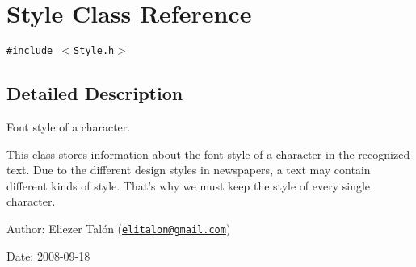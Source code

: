 \hypertarget{class_style}{
\section{Style Class Reference}
\label{class_style}
}
{\tt \#include $<$Style.h$>$}



\subsection{Detailed Description}
Font style of a character. 

This class stores information about the font style of a character in the recognized text. Due to the different design styles in newspapers, a text may contain different kinds of style. That's why we must keep the style of every single character.

\begin{Desc}
\item[Author:]Eliezer Talón (\href{mailto:elitalon@gmail.com}{\tt elitalon@gmail.com}) \end{Desc}
\begin{Desc}
\item[Date:]2008-09-18 \end{Desc}


